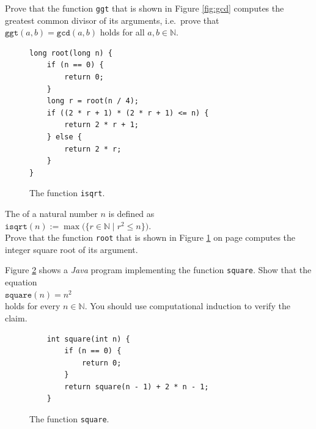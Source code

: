 \exerciseEng
Prove that the function \texttt{ggt} that is shown in Figure \ref{fig:gcd} computes the greatest common divisor
of its arguments, i.e.~prove that $\mathtt{ggt}(a, b) = \mathtt{gcd}(a, b)$ holds for all $a,b \in\mathbb{N}$.
\eox

\begin{figure}[!h]
  \centering
\begin{verbatim}
long root(long n) {
    if (n == 0) {
        return 0;
    }
    long r = root(n / 4);
    if ((2 * r + 1) * (2 * r + 1) <= n) {
        return 2 * r + 1;
    } else {
        return 2 * r;
    }
}
\end{verbatim}
\vspace*{-0.3cm}
  \caption{The function \texttt{isqrt}.}
  \label{fig:isqrt}
\end{figure} 

\exerciseEng
The  of a natural number $n$ is defined as 
\\[0.2cm]
\hspace*{1.3cm}
$\texttt{isqrt}(n) := \max\bigl(\{ r \in \mathbb{N} \mid r^2 \leq n \}\bigr)$.
\\[0.2cm]
Prove that the function \texttt{root} that is shown in Figure \ref{fig:isqrt} on page \pageref{fig:isqrt}
computes the integer square root of its argument. \eox


\exerciseEng
Figure \ref{fig:square} shows a \textsl{Java} program implementing the function \texttt{square}.  Show that the equation
\\[0.2cm]
\hspace*{1.3cm}
$\mathtt{square}(n) = n^2$
\\[0.2cm]
holds for every $n \in \mathbb{N}$.  You should use computational induction to verify the claim. \eox

\begin{figure}[!ht]
\centering
\begin{verbatim}
    int square(int n) {
        if (n == 0) {
            return 0;
        }
        return square(n - 1) + 2 * n - 1;
    }
\end{verbatim}
\vspace*{-0.3cm}
\caption{The function \texttt{square}.}
\label{fig:square}
\end{figure}

